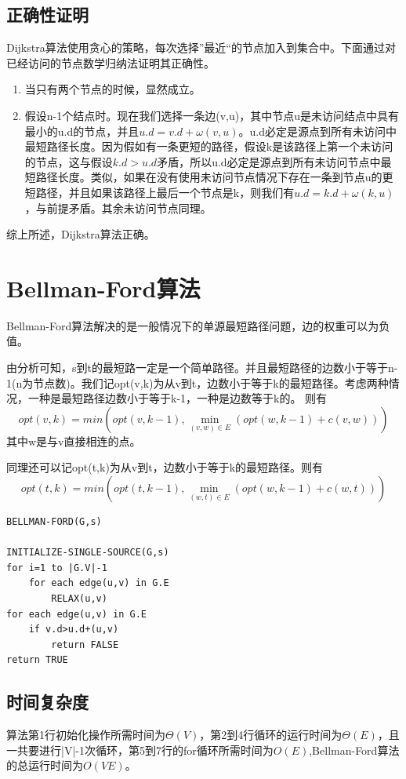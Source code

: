 \subsection{正确性证明}
Dijkstra算法使用贪心的策略，每次选择”最近“的节点加入到集合中。下面通过对已经访问的节点数学归纳法证明其正确性。

\begin{enumerate}
\item 当只有两个节点的时候，显然成立。

\item 假设n-1个结点时。现在我们选择一条边(v,u)，其中节点u是未访问结点中具有最小的u.d的节点，并且$u.d=v.d+\omega(v,u)$。u.d必定是源点到所有未访问中最短路径长度。因为假如有一条更短的路径，假设k是该路径上第一个未访问的节点，这与假设$k.d>u.d$矛盾，所以u.d必定是源点到所有未访问节点中最短路径长度。类似，如果在没有使用未访问节点情况下存在一条到节点u的更短路径，并且如果该路径上最后一个节点是k，则我们有$u.d=k.d+\omega(k,u)$，与前提矛盾。其余未访问节点同理。
\end{enumerate}

综上所述，Dijkstra算法正确。

\section{Bellman-Ford算法}
Bellman-Ford算法解决的是一般情况下的单源最短路径问题，边的权重可以为负值。

由分析可知，s到t的最短路一定是一个简单路径。并且最短路径的边数小于等于n-1(n为节点数)。我们记opt(v,k)为从v到t，边数小于等于k的最短路径。考虑两种情况，一种是最短路径边数小于等于k-1，一种是边数等于k的。
则有
$$opt(v,k)=min(opt(v,k-1),\min \limits_{(v,w)\in E}(opt(w,k-1)+c(v,w)))$$
其中w是与v直接相连的点。

同理还可以记opt(t,k)为从v到t，边数小于等于k的最短路径。则有
$$opt(t,k)=min(opt(t,k-1),\min \limits_{(w,t)\in E}(opt(w,k-1)+c(w,t)))$$

\begin{lstlisting}[caption=Bellman-Ford算法算法伪代码]
BELLMAN-FORD(G,s)

INITIALIZE-SINGLE-SOURCE(G,s)
for i=1 to |G.V|-1
	for each edge(u,v) in G.E
 		RELAX(u,v)
for each edge(u,v) in G.E
	if v.d>u.d+(u,v)
		return FALSE
return TRUE

\end{lstlisting}

\subsection{时间复杂度}
算法第1行初始化操作所需时间为$\Theta (V)$，第2到4行循环的运行时间为$\Theta (E)$，且一共要进行|V|-1次循环，第5到7行的for循环所需时间为$O(E)$,Bellman-Ford算法的总运行时间为$O(VE)$。

